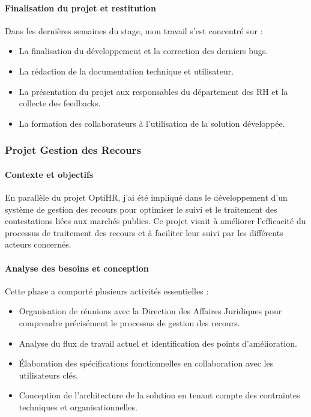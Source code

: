 \paragraph{Finalisation du projet et restitution}
Dans les dernières semaines du stage, mon travail s'est concentré sur :

\begin{itemize}
    \item La finalisation du développement et la correction des derniers bugs.
    \item La rédaction de la documentation technique et utilisateur.
    \item La présentation du projet aux responsables du département des \ac{RH} et la collecte des feedbacks.
    \item La formation des collaborateurs à l'utilisation de la solution développée.
\end{itemize}

\subsubsection{Projet Gestion des Recours}

\paragraph{Contexte et objectifs}
En parallèle du projet OptiHR, j'ai été impliqué dans le développement d'un système de gestion des recours pour optimiser le suivi et le traitement des contestations liées aux marchés publics. Ce projet visait à améliorer l'efficacité du processus de traitement des recours et à faciliter leur suivi par les différents acteurs concernés.

\paragraph{Analyse des besoins et conception}
Cette phase a comporté plusieurs activités essentielles :
\begin{itemize}
    \item Organisation de réunions avec la Direction des Affaires Juridiques pour comprendre précisément le processus de gestion des recours.
    \item Analyse du flux de travail actuel et identification des points d'amélioration.
    \item Élaboration des spécifications fonctionnelles en collaboration avec les utilisateurs clés.
    \item Conception de l'architecture de la solution en tenant compte des contraintes techniques et organisationnelles.
\end{itemize}

